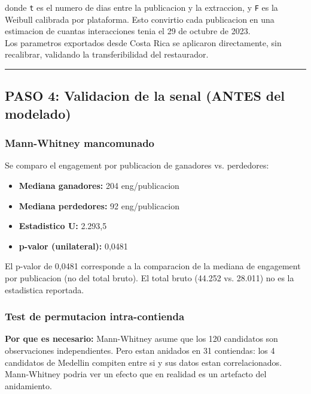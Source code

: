 \documentclass[11pt,a4paper]{article}
\begin{document}
donde \texttt{t} es el numero de dias entre la publicacion y la extraccion, y \texttt{F} es la Weibull calibrada por plataforma. Esto convirtio cada publicacion en una estimacion de cuantas interacciones tenia el 29 de octubre de 2023.\\[2pt]

Los parametros exportados desde Costa Rica se aplicaron directamente, sin recalibrar, validando la transferibilidad del restaurador.\\[2pt]

\vspace{4pt}\noindent\rule{\linewidth}{0.4pt}\vspace{4pt}

\subsection{PASO 4: Validacion de la senal (ANTES del modelado)}

\subsubsection{Mann-Whitney mancomunado}

Se comparo el engagement por publicacion de ganadores vs. perdedores:\\[2pt]

\begin{itemize}[noitemsep,topsep=2pt]
\item \textbf{Mediana ganadores:} 204 eng/publicacion
\item \textbf{Mediana perdedores:} 92 eng/publicacion
\item \textbf{Estadistico U:} 2.293,5
\item \textbf{p-valor (unilateral):} 0,0481
\end{itemize}

El p-valor de 0,0481 corresponde a la comparacion de la mediana de engagement por publicacion (no del total bruto). El total bruto (44.252 vs. 28.011) no es la estadistica reportada.\\[2pt]

\subsubsection{Test de permutacion intra-contienda}

\textbf{Por que es necesario:} Mann-Whitney asume que los 120 candidatos son observaciones independientes. Pero estan anidados en 31 contiendas: los 4 candidatos de Medellin compiten entre si y sus datos estan correlacionados. Mann-Whitney podria ver un efecto que en realidad es un artefacto del anidamiento.\\[2pt]
\end{document}
